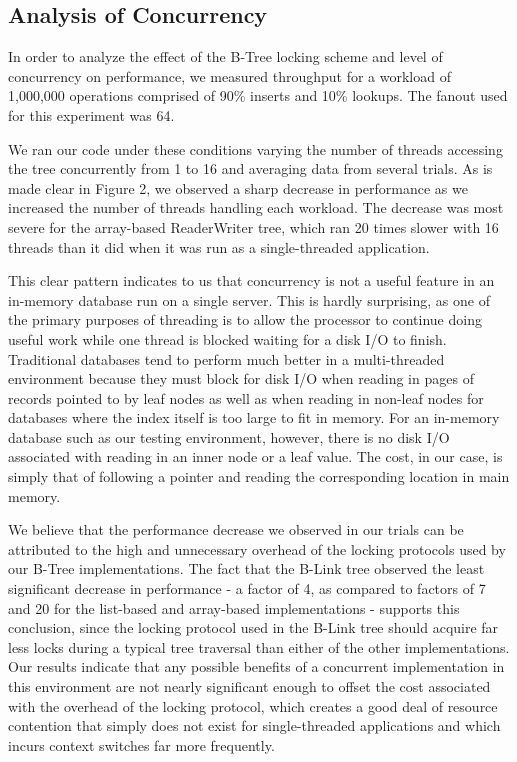 \documentclass{sig-alternate}
\begin{document}
\subsection{Analysis of Concurrency}
In order to analyze the effect of the B-Tree locking scheme and level of concurrency on performance, we measured throughput for a workload of 1,000,000 operations comprised of 90\% inserts and 10\% lookups. The fanout used for this experiment was 64.

We ran our code under these conditions varying the number of threads accessing the tree concurrently from 1 to 16 and averaging data from several trials. As is made clear in Figure 2, we observed a sharp decrease in performance as we increased the number of threads handling each workload. The decrease was most severe for the array-based ReaderWriter tree, which ran 20 times slower with 16 threads than it did when it was run as a single-threaded application.

This clear pattern indicates to us that concurrency is not a useful feature in an in-memory database run on a single server. This is hardly surprising, as one of the primary purposes of threading is to allow the processor to continue doing useful work while one thread is blocked waiting for a disk I/O to finish. Traditional databases tend to perform much better in a multi-threaded environment because they must block for disk I/O when reading in pages of records pointed to by leaf nodes as well as when reading in non-leaf nodes for databases where the index itself is too large to fit in memory. For an in-memory database such as our testing environment, however, there is no disk I/O associated with reading in an inner node or a leaf value. The cost, in our case, is simply that of following a pointer and reading the corresponding location in main memory. 

We believe that the performance decrease we observed in our trials can be attributed to the high and unnecessary overhead of the locking protocols used by our B-Tree implementations. The fact that the B-Link tree observed the least significant decrease in performance - a factor of 4, as compared to factors of 7 and 20 for the list-based and array-based implementations - supports this conclusion, since the locking protocol used in the B-Link tree should acquire far less locks during a typical tree traversal than either of the other implementations. Our results indicate that any possible benefits of a concurrent implementation in this environment are not nearly significant enough to offset the cost associated with the overhead of the locking protocol, which creates a good deal of resource contention that simply does not exist for single-threaded applications and which incurs context switches far more frequently. 
\end{document}
